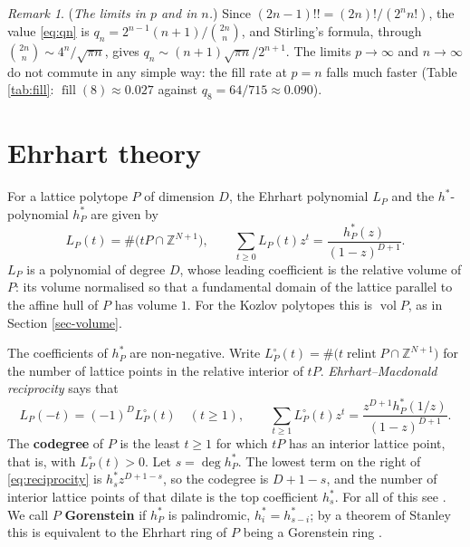 \documentclass[11pt, a4paper, abstract=yes]{scrartcl}
\theoremstyle{definition}
\theoremstyle{remark}
\newtheorem{remark}[definition]{Remark}
\theoremstyle{plain}
\theoremstyle{remark}
\theoremstyle{plain}
\newcommand{\vol}{\operatorname{vol}}
\newcommand{\relint}{\operatorname{relint}}
\begin{document}
\begin{remark}
(\emph{The limits in \(p\) and in \(n\).}) Since \((2n-1)!!=(2n)!/(2^nn!)\), the value \eqref{eq:qn} is
\(q_n=2^{n-1}(n+1)/\binom{2n}n\), and Stirling's formula, through \(\binom{2n}n\sim4^n/\sqrt{\pi n}\),
gives \(q_n\sim(n+1)\sqrt{\pi n}/2^{n+1}\). The limits \(p\to\infty\) and \(n\to\infty\) do not
commute in any simple way: the fill rate at \(p=n\) falls much faster (Table \ref{tab:fill}: \(\operatorname{fill}(8)\approx0.027\) against
\(q_8=64/715\approx0.090\)).
\label{rem-kupreyeva-limit}
\end{remark}
\section{Ehrhart theory}
\label{sec-ehrhart}
For a lattice polytope \(P\) of dimension \(D\), the Ehrhart polynomial \(L_P\) and the
\(h^*\)-polynomial \(h^*_P\) are given by
\begin{equation}\label{eq:ehrhart}
  L_P(t)=\#\bigl(tP\cap\mathbb Z^{N+1}\bigr),\qquad
  \sum_{t\ge0}L_P(t)z^t=\frac{h^*_P(z)}{(1-z)^{D+1}} .
\end{equation}
\(L_P\) is a polynomial of degree \(D\), whose leading coefficient is the relative volume of \(P\):
its volume normalised so that a fundamental domain of the lattice parallel to the affine hull of
\(P\) has volume \(1\). For the Kozlov polytopes this is \(\vol P\), as in Section \ref{sec-volume}.

The coefficients of \(h^*_P\) are non-negative. Write
\(L^\circ_P(t)=\#\bigl(t\relint P\cap\mathbb Z^{N+1}\bigr)\) for the number of lattice points in the
relative interior of \(tP\). \emph{Ehrhart--Macdonald reciprocity} says that
\begin{equation}\label{eq:reciprocity}
  L_P(-t)=(-1)^DL^\circ_P(t)\quad(t\ge1),\qquad
  \sum_{t\ge1}L^\circ_P(t)z^t=\frac{z^{D+1}h^*_P(1/z)}{(1-z)^{D+1}} .
\end{equation}
The \textbf{codegree} of \(P\) is the least \(t\ge1\) for which \(tP\) has an interior lattice point,
that is, with \(L^\circ_P(t)>0\). Let \(s=\deg h^*_P\). The lowest term on the right of
\eqref{eq:reciprocity} is \(h^*_sz^{D+1-s}\), so the codegree is \(D+1-s\), and the number of
interior lattice points of that dilate is the top coefficient \(h^*_s\). For all of this see
\autocite[Chapters 3 and 4, in particular Theorems 4.1, 4.4 and 4.5]{BeckRobins2015}. We call \(P\)
\textbf{Gorenstein} if \(h^*_P\) is palindromic, \(h^*_i=h^*_{s-i}\); by a theorem of Stanley this is
equivalent to the Ehrhart ring of \(P\) being a Gorenstein ring \autocite{Stanley1996}.
\end{document}
